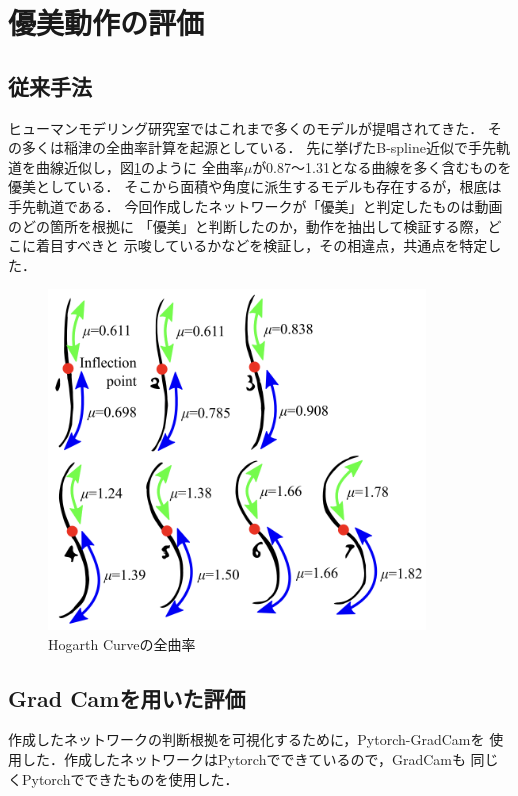 \section{優美動作の評価}

\subsection{従来手法}
ヒューマンモデリング研究室ではこれまで多くのモデルが提唱されてきた．
その多くは稲津\cite{inazu2}の全曲率計算を起源としている．
先に挙げたB-spline近似で手先軌道を曲線近似し，図\ref{curves}のように
全曲率$\mu$が0.87〜1.31となる曲線を多く含むものを優美としている．
そこから面積や角度に派生するモデルも存在するが，根底は手先軌道である．
今回作成したネットワークが「優美」と判定したものは動画のどの箇所を根拠に
「優美」と判断したのか，動作を抽出して検証する際，どこに着目すべきと
示唆しているかなどを検証し，その相違点，共通点を特定した．

\begin{figure}[b]
  \begin{center}
    \includegraphics[width=100mm]{images/quote/curves.png}
  \end{center}
  \caption{Hogarth Curveの全曲率}
  \label{curves}
\end{figure}

\subsection{Grad Camを用いた評価}
作成したネットワークの判断根拠を可視化するために，Pytorch-GradCam\cite{pygradcam}を
使用した．作成したネットワークはPytorch\cite{pytorch}でできているので，GradCamも
同じくPytorchでできたものを使用した．

